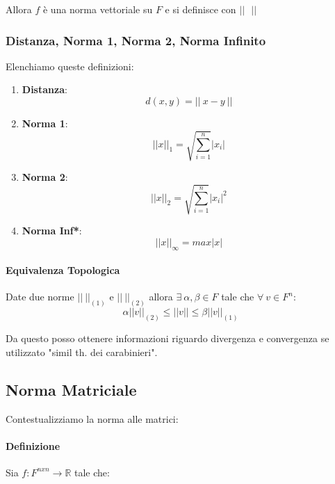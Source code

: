 \documentclass{article}
\begin{document}
Allora $f$ è una norma vettoriale su $F$ e si definisce con $\boxed{|| \:\:\:||}$

\subsubsection{Distanza, Norma 1, Norma 2, Norma Infinito}

Elenchiamo queste definizioni:

\begin{enumerate}
    \item \textbf{Distanza}:
    \[ d(x,y) = || \: x - y \:|| \]
    \item \textbf{Norma 1}:
    \vspace*{12px}
    \[ \boxed{|| x ||_{1} = \sqrt{\sum^{n}_{i=1}}|x_{i}|} \]
    \vspace*{4px}
    \item \textbf{Norma 2}:
    \vspace*{12px}
    \[ \boxed{|| x ||_{2} = \sqrt{\sum^{n}_{i=1}}|x_{i}|^2} \]
    \vspace*{4px}
    \item \textbf{Norma Inf*}:
    \vspace*{12px}
    \[ \boxed{|| x ||_{\infty} = max|x|} \]
    \vspace*{4px}
\end{enumerate}

\newpage

\paragraph{Equivalenza Topologica} Date due norme $||\:||_{(1)}$ e $||\:||_{(2)}$ allora $\exists \: \alpha,\beta \in F$ tale che $\forall \: v \in F^{n}$:
\[ \alpha||v||_{(2)} \leq ||v|| \leq \beta||v||_{(1)}\]

Da questo posso ottenere informazioni riguardo divergenza e convergenza se utilizzato "simil th. dei carabinieri".

\subsection{Norma Matriciale}

Contestualizziamo la norma alle matrici:

\paragraph{Definizione} Sia $f: F^{nxn} \xrightarrow{} \mathbb{R}$ tale che:
\end{document}

